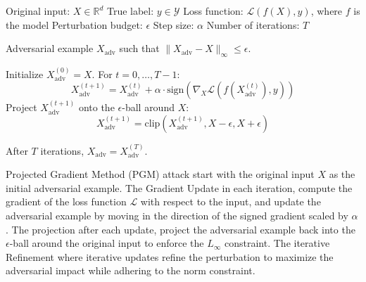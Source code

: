Original input: $X \in \mathbb{R}^d$
True label: $y \in \mathcal{Y}$
Loss function: $\mathcal{L}(f(X), y)$, where $f$ is the model
Perturbation budget: $\epsilon$
Step size: $\alpha$
Number of iterations: $T$


Adversarial example $X_{\text{adv}}$ such that $\|X_{\text{adv}} - X\|_\infty \leq \epsilon$.

Initialize $X^{(0)}_{\text{adv}} = X$. For $t = 0, \dots, T-1$:
\[
X^{(t+1)}_{\text{adv}} = X^{(t)}_{\text{adv}} + \alpha \cdot \text{sign}(\nabla_X \mathcal{L}(f(X^{(t)}_{\text{adv}}), y))
\]
Project $X^{(t+1)}_{\text{adv}}$ onto the $\epsilon$-ball around $X$:
\[
X^{(t+1)}_{\text{adv}} = \text{clip}(X^{(t+1)}_{\text{adv}}, X - \epsilon, X + \epsilon)
\]

After $T$ iterations, $X_{\text{adv}} = X^{(T)}_{\text{adv}}$.

 Projected Gradient Method (PGM) attack start with the original input $X$ as the initial adversarial example. The Gradient Update in each iteration, compute the gradient of the loss function $\mathcal{L}$ with respect to the input, and update the adversarial example by moving in the direction of the signed gradient scaled by $\alpha$. The projection after each update, project the adversarial example back into the $\epsilon$-ball around the original input to enforce the $L_\infty$ constraint. The iterative Refinement where iterative updates refine the perturbation to maximize the adversarial impact while adhering to the norm constraint.

